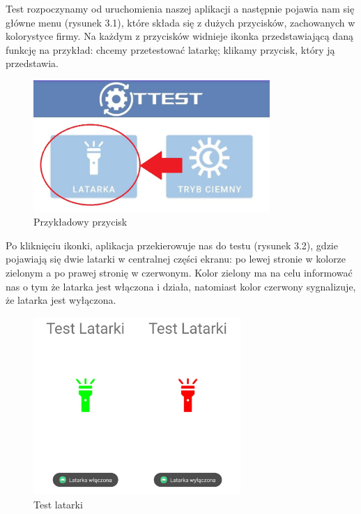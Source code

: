 Test rozpoczynamy od uruchomienia naszej aplikacji a następnie pojawia nam się główne menu (rysunek 3.1), które składa się z dużych przycisków, zachowanych w kolorystyce firmy.
Na każdym z przycisków widnieje ikonka przedstawiającą daną funkcję na przykład: chcemy przetestować latarkę; klikamy przycisk, który ją przedstawia.\newline
\begin{figure}[!hbt]
	\begin{center}
		\includegraphics[angle=360, width=0.80\textwidth]{rys/przyklad_1.jpg}
		\caption{Przykładowy przycisk}
		\label{rys:przyklad}
	\end{center}
\end{figure}
\newline

Po kliknięciu ikonki, aplikacja przekierowuje nas do testu (rysunek 3.2), gdzie pojawiają się dwie latarki w centralnej części ekranu: po lewej stronie w kolorze zielonym a po prawej stronię w czerwonym. Kolor zielony ma na celu informować nas o tym że latarka jest włączona i działa, natomiast kolor czerwony sygnalizuje, że latarka jest wyłączona.
\newpage
\begin{figure}[!hbt]
	\begin{center}
		\includegraphics[angle=360, width=0.70\textwidth]{rys/przyklad_2.png}
		\caption{Test latarki}
		\label{rys:przyklad}
	\end{center}
\end{figure}   


